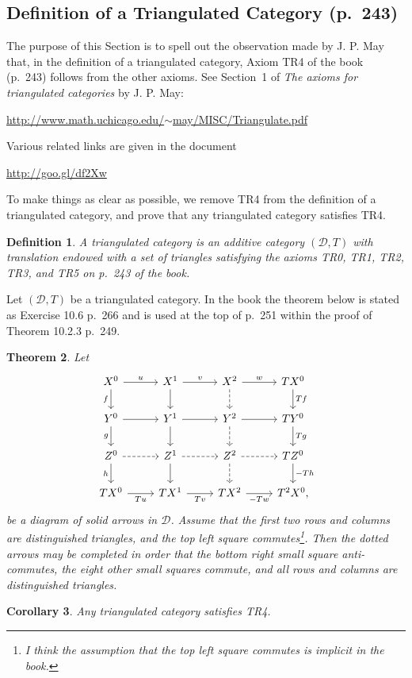 \documentclass[12pt]{article}
\newtheorem{thm}{Theorem}
\newtheorem{cor}[thm]{Corollary}
\newtheorem{df}[thm]{Definition}%
\theoremstyle{remark}
\theoremstyle{definition}
\newcommand{\cc}{\mathcal}
\begin{document}
\subsection{Definition of a Triangulated Category (p.~243)} %
%
The purpose of this Section is to spell out the observation made by J. P. May that, in the definition of a triangulated category, Axiom TR4 of the book (p.~243) follows from the other axioms. See Section~1 of {\em The axioms for triangulated categories} by J. P. May:%
%
\begin{center}\href{http://www.math.uchicago.edu/~may/MISC/Triangulate.pdf}{http://www.math.uchicago.edu/$\sim$may/MISC/Triangulate.pdf}%
\end{center}
%
Various related links are given in the document%
%
\begin{center}\href{http://goo.gl/df2Xw}{http://goo.gl/df2Xw}%
\end{center}

To make things as clear as possible, we remove TR4 from the definition of a triangulated category, and prove that any triangulated category satisfies TR4. 
%
\begin{df}
A {\em triangulated category} is an additive category $(\cc D,T)$ with translation endowed with a set of triangles satisfying the axioms {\em TR0, TR1, TR2, TR3}, and {\em TR5} on p.~243 of the book.
\end{df}
%
Let $(\cc D,T)$ be a triangulated category. In the book the theorem below is stated as Exercise 10.6 p.~266 and is used at the top of p.~251 within the proof of Theorem 10.2.3 p.~249.
%
\begin{thm}\label{mayt}
Let 
$$
\begin{tikzcd}
X^0\ar{r}{u}\ar{d}[swap]{f}&X^1\ar{d}\ar{r}{v}&X^2\ar[dashed]{d}\ar{r}{w}&TX^0\ar{d}{Tf}\\ 
Y^0\ar{r}\ar{d}[swap]{g}&Y^1\ar{d}\ar{r}&Y^2\ar[dashed]{d}\ar{r}&TY^0\ar{d}{Tg}\\ 
Z^0\ar[dashed]{r}\ar{d}[swap]{h}&Z^1\ar{d}\ar[dashed]{r}&Z^2\ar[dashed]{d}\ar[dashed]{r}&TZ^0\ar{d}{-Th}\\ 
TX^0\ar{r}[swap]{Tu}&TX^1\ar{r}[swap]{Tv}&TX^2\ar{r}[swap]{-Tw}&T^2X^0,
\end{tikzcd}
$$ 
be a diagram of solid arrows in $\cc D$. Assume that the first two rows and columns are distinguished triangles, and the top left square commutes\footnote{I think the assumption that the top left square commutes is implicit in the book.}. Then the dotted arrows may be completed in order that the bottom right small square anti-commutes, the eight other small squares commute, and all rows and columns are distinguished triangles. 
\end{thm}
%
\begin{cor}\label{may}
Any triangulated category satisfies {\em TR4}.
\end{cor} 
\end{document}
